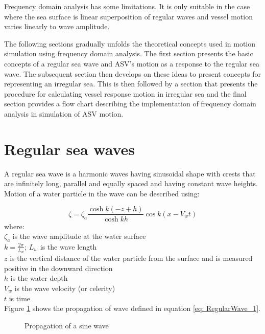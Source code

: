 Frequency domain analysis has some limitations. It is only suitable in the case
where the sea surface is linear superposition of regular waves and vessel motion
varies linearly to wave amplitude. 

The following sections gradually unfolds the theoretical concepts used in motion
simulation using frequency domain analysis. The first section presents the basic 
concepts of a regular sea wave and ASV's motion as a response to the regular sea 
wave. The subsequent section then develops on these ideas to present concepts 
for representing an irregular sea. This is then followed by a section that
presents the procedure for calculating vessel response motion in irregular sea
and the final section provides a flow chart describing the implementation of
frequency domain analysis in simulation of ASV motion.

\section{Regular sea waves}
A regular sea wave is a harmonic waves having sinusoidal shape with crests that 
are infinitely long, parallel and equally spaced and having constant wave 
heights. Motion of a water particle in the wave can be described using:

\begin{equation} 
  \zeta = \zeta_a \frac{\cosh k(-z + h)}{\cosh k h} \cos k(x - V_w t)
  \label{eq: RegularWave_1}
\end{equation}
where: \\
$\zeta_a$ is the wave amplitude at the water surface\\
$k = \frac{2 \pi}{L_w}$; $L_w$ is the wave length\\
$z$ is the vertical distance of the water particle from the surface and is 
measured positive in the downward direction\\
$h$ is the water depth\\
$V_w$ is the wave velocity (or celerity)\\
$t$ is time\\
Figure \ref{fig: RegularWave_1} shows the propagation of wave defined in
equation \ref{eq: RegularWave_1}.

\begin{figure} 
  \caption{Propagation of a sine wave}
  \label{fig: RegularWave_1}
\end{figure}

